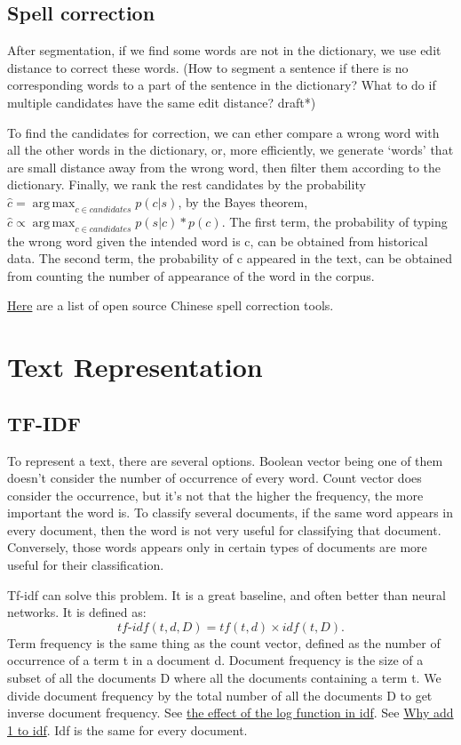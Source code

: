 \documentclass{report}
\DeclareMathOperator*{\argmax}{arg\,max}
\begin{document}
\section{Spell correction}
After segmentation, if we find some words are not in the dictionary, we use edit distance to correct these words. (How to segment a sentence if there is no corresponding words to a part of the sentence in the dictionary? What to do if multiple candidates have the same edit distance? draft*)

To find the candidates for correction, we can ether compare a wrong word with all the other words in the dictionary, or, more efficiently, we generate `words' that are small distance away from the wrong word, then filter them according to the dictionary. Finally, we rank the rest candidates by the probability $\hat{c} = \argmax_{c \in candidates} p(c|s)$, by the Bayes theorem, $\hat{c} \propto \argmax_{c \in candidates} p(s|c) * p(c)$. The first term, the probability of typing the wrong word given the intended word is c, can be obtained from historical data. The second term, the probability of c appeared in the text, can be obtained from counting the number of appearance of the word in the corpus.

\href{https://github.com/li-aolong/li-aolong.github.io/issues/12}{Here} are a list of open source Chinese spell correction tools.

\chapter{Text Representation}
\section{TF-IDF}
To represent a text, there are several options. Boolean vector being one of them doesn't consider the number of occurrence of every word. Count vector does consider the occurrence, but it's not that the higher the frequency, the more important the word is. To classify several documents, if the same word appears in every document, then the word is not very useful for classifying that document. Conversely, those words appears only in certain types of documents are more useful for their classification.

Tf-idf can solve this problem. It is a great baseline, and often better than neural networks. It is defined as: \[
	tf\text{-}idf(t, d, D) = tf(t, d) \times idf(t, D)
.\] 
Term frequency is the same thing as the count vector, defined as the number of occurrence of a term t in a document d. Document frequency is the size of a subset of all the documents D where all the documents containing a term t. We divide document frequency by the total number of all the documents D to get inverse document frequency. 
See \href{https://stackoverflow.com/q/27067992/9851286}{the effect of the log function in idf}. See \href{https://stats.stackexchange.com/q/166812/354019}{Why add 1 to idf}.
Idf is the same for every document.
\end{document}
